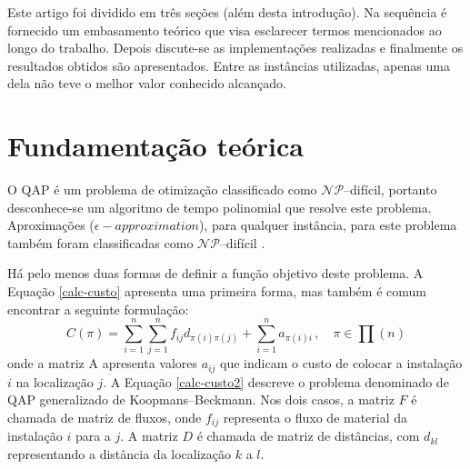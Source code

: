 Este artigo foi dividido em três seções (além desta introdução). Na
sequência é fornecido um embasamento teórico que visa esclarecer
termos mencionados ao longo do trabalho. Depois discute-se as
implementações realizadas e finalmente os resultados obtidos são
apresentados. Entre as instâncias utilizadas, apenas uma dela não teve
o melhor valor conhecido alcançado. %


\section{Fundamentação teórica}
\label{sec:teorico}

O QAP é um problema de otimização classificado como
$\mathcal{NP}$--difícil,
portanto desconhece-se um algoritmo de tempo polinomial que resolve
este problema. Aproximações ($\epsilon-approximation$), para qualquer
instância, para este problema também foram classificadas como
$\mathcal{NP}$--difícil \cite{sahni-gonzales}.

Há pelo menos duas formas de definir a função objetivo deste problema.
A Equação \ref{calc-custo} apresenta uma primeira forma,
mas também é comum encontrar a seguinte formulação:
\begin{equation}\label{calc-custo2}
C(\pi) = \sum_{i = 1}^{n} \sum_{j = 1}^{n} f_{ij} d_{\pi(i)
   \pi(j)} + \sum_{i = 1}^{n} a_{\pi(i) i} \, , \quad \pi \in \prod(n)
\end{equation}
onde a matriz A apresenta valores $a_{ij}$ que indicam o custo de
colocar a instalação $i$ na localização $j$. A Equação
\ref{calc-custo2} descreve o problema denominado de QAP generalizado
de Koopmans--Beckmann. %
Nos dois casos, a matriz $F$ é chamada de matriz de fluxos, onde
$f_{ij}$ representa o
fluxo de material da instalação $i$ para a $j$. A matriz $D$ é chamada
de matriz de distâncias, com $d_{kl}$ representando a distância da
localização $k$ a $l$.%


